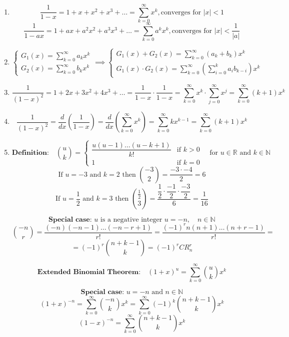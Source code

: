 \documentclass[11pt]{article}
\begin{document}
\begin{enumerate}
    \item $$\frac{1}{1 - x} = 1 + x + x^2 + x^3 + \dots = \sum_{k=0}^{\infty} x^k, \text{converges for } |x| < 1$$
          $$\frac{1}{1 - ax} = 1 + ax + a^2 x^2 + a^3 x^3 + \dots = \sum_{k=0}^{\infty} a^k x^k, \text{converges for } |x| < \frac{1}{|a|}$$
    \item $$\begin{cases}
                G_1(x) = \sum_{k = 0}^{\infty} a_kx^k \\
                G_2(x) = \sum_{k = 0}^{\infty} b_kx^k
            \end{cases} \implies 
            \begin{cases}
                G_1(x) + G_2(x) = \sum_{k = 0}^{\infty} (a_k + b_k)x^k \\
                G_1(x) \cdot G_2(x) = \sum_{k = 0}^{\infty} \left( \sum_{i = 0}^{k} a_i b_{k-i} \right)x^k
            \end{cases}$$
    \item $$\frac{1}{(1 - x)^2} = 1 + 2x + 3x^2 + 4x^3 + \dots = \frac{1}{1 - x} \cdot \frac{1}{1 - x} = \sum_{k = 0}^{\infty} x^k \cdot \sum_{j = 0}^{\infty} x^j = \sum_{k = 0}^{\infty} (k + 1)x^k$$
    \item $$\frac{1}{(1 - x)^2} = \frac{d}{dx} \left( \frac{1}{1 - x} \right) = \frac{d}{dx} \left( \sum_{k = 0}^{\infty} x^k \right) = \sum_{k = 0}^{\infty} kx^{k-1} = \sum_{k = 0}^{\infty} (k + 1)x^k$$
    \item $$\textbf{Definition:} \quad \binom{u}{k} = 
            \begin{cases}
                \dfrac{u(u-1)\dots(u-k+1)}{k!} & \text{if } k > 0 \\
                1 & \text{if } k = 0
            \end{cases}
            \quad \text{for } u \in \mathbb{R} \text{ and } k \in \mathbb{N}$$
            $$\text{If } u = -3 \text{ and } k = 2 \text{ then } \binom{-3}{2} = \frac{-3 \cdot -4}{2} = 6$$
            $$\text{If } u = \frac{1}{2} \text{ and } k = 3 \text{ then } \binom{\frac{1}{2}}{3} = \dfrac{\dfrac{1}{2} \cdot \dfrac{-1}{2} \cdot \dfrac{-3}{2}}{6} = \frac{1}{16}$$
            
            $$\textbf{Special case: } u \text{ is a negative integer } u = - n, \quad n \in \mathbb{N}$$
            $$\binom{-n}{r} = \frac{(-n)(-n-1)\dots(-n-r+1)}{r!} = \frac{(-1)^r n(n+1)\dots(n+r-1)}{r!} = $$
            $$= (-1)^r \binom{n+k-1}{k} = (-1)^r CR_n^r$$
            
            $$\textbf{Extended Binomial Theorem:} \quad (1 + x)^u = \sum_{k = 0}^{\infty} \binom{u}{k} x^k$$

            $$\textbf{Special case: } u = -n \text{ and } n \in \mathbb{N} $$
            $$(1 + x)^{-n} = \sum_{k = 0}^{\infty} \binom{-n}{k} x^k = \sum_{k = 0}^{\infty} (-1)^k \binom{n + k - 1}{k} x^k$$
            $$(1 - x)^{-n} = \sum_{k = 0}^{\infty} \binom{n + k - 1}{k} x^k$$ 
\end{enumerate}
\end{document}

